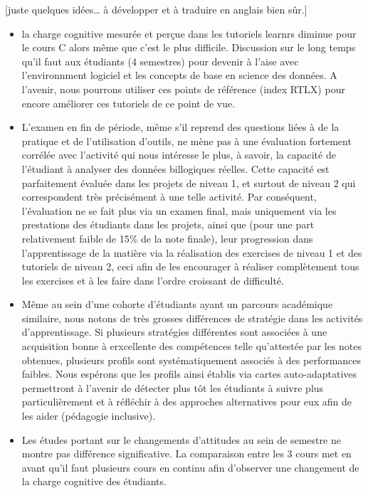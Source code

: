 \documentclass[
]{article}
\begin{document}
{[}juste quelques idées\ldots{} à développer et à traduire en anglais
bien sûr.{]}

\begin{itemize}
\item
  la charge cognitive mesurée et perçue dans les tutoriels learnrs
  diminue pour le cours C alors même que c'est le plus difficile.
  Discussion sur le long temps qu'il faut aux étudiants (4 semestres)
  pour devenir à l'aise avec l'environnment logiciel et les concepts de
  base en science des données. A l'avenir, nous pourrons utiliser ces
  points de référence (index RTLX) pour encore améliorer ces tutoriels
  de ce point de vue.
\item
  L'examen en fin de période, même s'il reprend des questions liées à de
  la pratique et de l'utilisation d'outils, ne mène pas à une évaluation
  fortement corrélée avec l'activité qui nous intéresse le plus, à
  savoir, la capacité de l'étudiant à analyser des données billogiques
  réelles. Cette capacité est parfaitement évaluée dans les projets de
  niveau 1, et surtout de niveau 2 qui correspondent très précisément à
  une telle activité. Par conséquent, l'évaluation ne se fait plus via
  un examen final, mais uniquement via les prestations des étudiants
  dans les projets, ainsi que (pour une part relativement faible de 15\%
  de la note finale), leur progression dans l'apprentissage de la
  matière via la réalisation des exercises de niveau 1 et des tutoriels
  de niveau 2, ceci afin de les encourager à réaliser complètement tous
  les exercises et à les faire dans l'ordre croissant de difficulté.
\item
  Même au sein d'une cohorte d'étudiants ayant un parcours académique
  similaire, nous notons de très grosses différences de stratégie dans
  les activités d'apprentissage. Si plusieurs stratégies différentes
  sont associées à une acquisition bonne à erxcellente des compétences
  telle qu'attestée par les notes obtenues, plusieurs profils sont
  systématiquement associés à des performances faibles. Nous espérons
  que les profils ainsi établis via cartes auto-adaptatives permettront
  à l'avenir de détecter plus tôt les étudiants à suivre plus
  particulièrement et à réfléchir à des approches alternatives pour eux
  afin de les aider (pédagogie inclusive).
\item
  Les études portant sur le changements d'attitudes au sein de semestre
  ne montre pas différence significative. La comparaison entre les 3
  cours met en avant qu'il faut plusieurs cours en continu afin
  d'observer une changement de la charge cognitive des étudiants.

\end{itemize}
\end{document}
